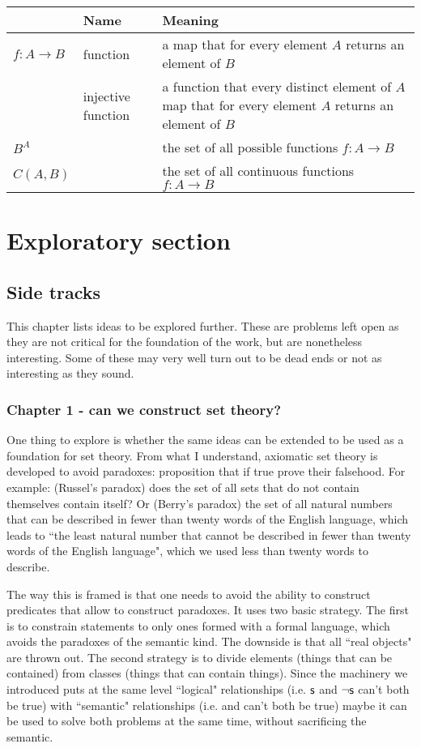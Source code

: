 \documentclass[11pt,letterpaper,fleqn]{memoir} %
\begin{document}
\begin{tabular}{p{} p{} p{}}
	& Name & Meaning  \\ 
	\hline 
	$f : A \to B$ & function & a map that for every element $A$ returns an element of $B$ \\ 
	\hline 
	& injective function & a function that every distinct element of $A$ map that for every element $A$ returns an element of $B$ \\ 
	\hline 
	$B^A$ &  & the set of all possible functions $f : A \to B$  \\ 
	\hline 
	$C(A,B)$ & & the set of all continuous functions $f : A \to B$  \\ 
	\hline 
		
\end{tabular} 


\chapter{Exploratory section}

\section{Side tracks}

This chapter lists ideas to be explored further. These are problems left open as they are not critical for the foundation of the work, but are nonetheless interesting. Some of these may very well turn out to be dead ends or not as interesting as they sound.

\subsection{Chapter 1 - can we construct set theory?}

One thing to explore is whether the same ideas can be extended to be used as a foundation for set theory. From what I understand, axiomatic set theory is developed to avoid paradoxes: proposition that if true prove their falsehood. For example: (Russel's paradox) does the set of all sets that do not contain themselves contain itself? Or (Berry's paradox) the set of all natural numbers that can be described in fewer than twenty words of the English language, which leads to ``the least natural number that cannot be described in fewer than twenty words of the English language", which we used less than twenty words to describe.

The way this is framed is that one needs to avoid the ability to construct predicates that allow to construct paradoxes. It uses two basic strategy. The first is to constrain statements to only ones formed with a formal language, which avoids the paradoxes of the semantic kind. The downside is that all ``real objects" are thrown out. The second strategy is to divide elements (things that can be contained) from classes (things that can contain things). Since the machinery we introduced puts at the same level ``logical" relationships (i.e. $\mathsf{s}$ and $\neg\mathsf{s}$ can't both be true) with ``semantic" relationships (i.e.  and  can't both be true) maybe it can be used to solve both problems at the same time, without sacrificing the semantic.
\end{document}
